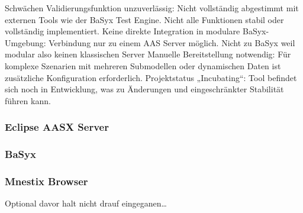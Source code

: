 Schwächen
Validierungsfunktion unzuverlässig: Nicht vollständig abgestimmt mit externen Tools wie der BaSyx Test Engine.
Nicht alle Funktionen stabil oder vollständig implementiert.
Keine direkte Integration in modulare BaSyx-Umgebung: Verbindung nur zu einem AAS Server möglich. Nicht zu BaSyx weil modular also keinen klassischen Server
Manuelle Bereitstellung notwendig: Für komplexe Szenarien mit mehreren Submodellen oder dynamischen Daten ist zusätzliche Konfiguration erforderlich.
Projektstatus „Incubating“: Tool befindet sich noch in Entwicklung, was zu Änderungen und eingeschränkter Stabilität führen kann.

\subsubsection{Eclipse AASX Server}
\subsubsection{BaSyx}
\subsubsection{Mnestix Browser}
Optional davor halt nicht drauf eingeganen\dots